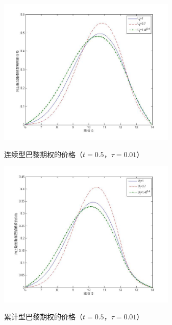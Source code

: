 \documentclass{ctexart} %
\begin{document}
\begin{figure}[H]
\begin{minipage}{0.48\linewidth}
\label{t0.5}
\includegraphics[width=8.5cm]{code/t0.5.jpg}
\caption{连续型巴黎期权的价格（$t=0.5$，$\tau=0.01$）}
\end{minipage}
\begin{minipage}{0.48\linewidth}
\label{t0.5c}
\includegraphics[width=8.5cm]{code/tc0.5.jpg}
\caption{累计型巴黎期权的价格（$t=0.5$，$\tau=0.01$）}
\end{minipage}
\end{figure}
\end{document}
